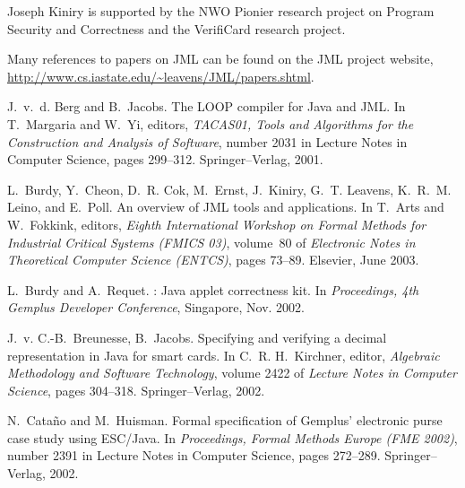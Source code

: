 \documentclass{article}
\begin{document}
Joseph Kiniry is supported by the NWO Pionier research
project on Program Security and Correctness and the VerifiCard
research project. 


%

%  

\begin{thebibliography}{10}

Many references to papers on JML can be found on the JML project website,
  \url{http://www.cs.iastate.edu/~leavens/JML/papers.shtml}.

J.~v.~d. Berg and B.~Jacobs.
\newblock The {LOOP} compiler for {Java} and {JML}.
\newblock In T.~Margaria and W.~Yi, editors, {\em {TACAS01}, Tools and
  Algorithms for the Construction and Analysis of Software}, number 2031 in
  Lecture Notes in Computer Science, pages 299--312. Springer--Verlag, 2001.

L.~Burdy, Y.~Cheon, D.~R. Cok, M.~Ernst, J.~Kiniry, G.~T. Leavens, K.~R.~M.
  Leino, and E.~Poll.
\newblock An overview of {JML} tools and applications.
\newblock In T.~Arts and W.~Fokkink, editors, {\em Eighth International
  Workshop on Formal Methods for Industrial Critical Systems (FMICS 03)},
  volume~80 of {\em Electronic Notes in Theoretical Computer Science (ENTCS)},
  pages 73--89. Elsevier, June 2003.

L.~Burdy and A.~Requet.
: Java applet correctness kit.
\newblock In {\em Proceedings, 4th Gemplus Developer Conference}, Singapore,
  Nov. 2002.

J.~v. C.-B.~Breunesse, B.~Jacobs.
\newblock Specifying and verifying a decimal representation in {Java} for smart
  cards.
\newblock In C.~R. H.~Kirchner, editor, {\em Algebraic Methodology and Software
  Technology}, volume 2422 of {\em Lecture Notes in Computer Science}, pages
  304--318. Springer--Verlag, 2002.

N.~Cata{\~n}o and M.~Huisman.
\newblock Formal specification of {Gemplus'} electronic purse case study using
  {ESC/Java}.
\newblock In {\em Proceedings, Formal Methods Europe ({FME} 2002)}, number 2391
  in Lecture Notes in Computer Science, pages 272--289. Springer--Verlag, 2002.


\end{thebibliography}
\end{document}
